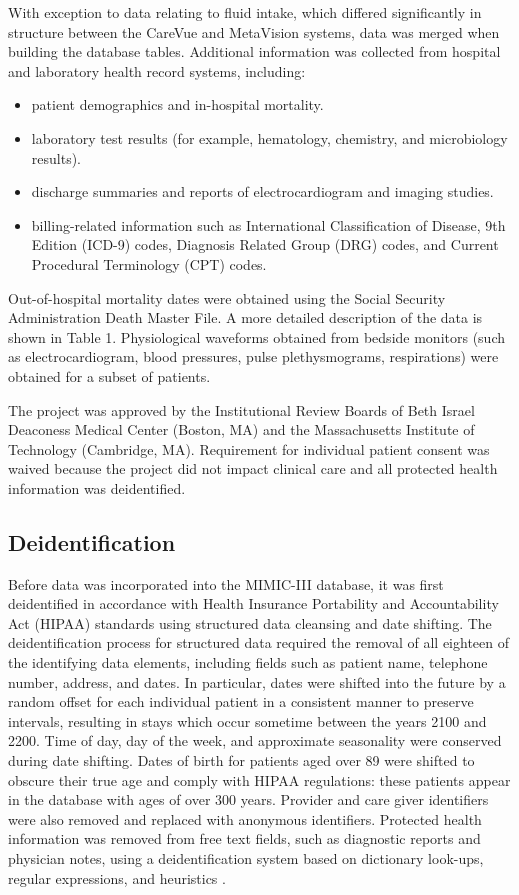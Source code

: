 \documentclass[english]{article}
\begin{document}
With exception to data relating to fluid intake, which differed significantly in structure between the CareVue and MetaVision systems, data was merged when building the database tables. Additional information was collected from hospital and laboratory health record systems, including:
\begin{itemize}
  \item patient demographics and in-hospital mortality.
  \item laboratory test results (for example, hematology, chemistry, and microbiology results).
  \item discharge summaries and reports of electrocardiogram and imaging studies.
  \item billing-related information such as International Classification of Disease, 9th Edition (ICD-9) codes, Diagnosis Related Group (DRG) codes, and Current Procedural Terminology (CPT) codes.
\end{itemize}
Out-of-hospital mortality dates were obtained using the Social Security Administration Death Master File. A more detailed description of the data is shown in Table 1. Physiological waveforms obtained from bedside monitors (such as electrocardiogram, blood pressures, pulse plethysmograms, respirations) were obtained for a subset of patients. 

The project was approved by the Institutional Review Boards of Beth Israel Deaconess Medical Center (Boston, MA) and the Massachusetts Institute of Technology (Cambridge, MA). Requirement for individual patient consent was waived because the project did not impact clinical care and all protected health information was deidentified.

\subsection*{Deidentification}

Before data was incorporated into the MIMIC-III database, it was first deidentified in accordance with Health Insurance Portability and Accountability Act (HIPAA) standards using structured data cleansing and date shifting. The deidentification process for structured data required the removal of all eighteen of the identifying data elements, including fields such as patient name, telephone number, address, and dates. In particular, dates were shifted into the future by a random offset for each individual patient in a consistent manner to preserve intervals, resulting in stays which occur sometime between the years 2100 and 2200. Time of day, day of the week, and approximate seasonality were conserved during date shifting. Dates of birth for patients aged over 89 were shifted to obscure their true age and comply with HIPAA regulations: these patients appear in the database with ages of over 300 years. Provider and care giver identifiers were also removed and replaced with anonymous identifiers. Protected health information was removed from free text fields, such as diagnostic reports and physician notes, using a deidentification system based on dictionary look-ups, regular expressions, and heuristics \cite{cite5}.
\end{document}
